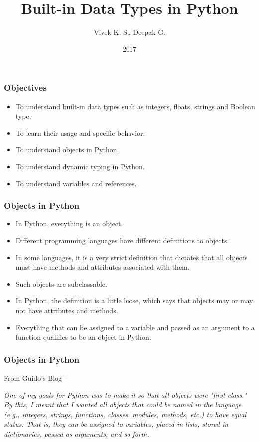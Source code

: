 \documentclass{beamer}
\title{Built-in Data Types in Python}
\author{Vivek K. S., Deepak G.}
\institute{Information Systems Decision Sciences (ISDS)\\
MUMA College of Business\\
University of South Florida \\
Tampa, Florida}
\date{2017}
\begin{document}
 
\frame{\titlepage}
 
\begin{frame}
\frametitle{Objectives}

\begin{itemize}
\item To understand built-in data types such as integers, floats, strings and Boolean type.
\item To learn their usage and specific behavior.
\item To understand objects in Python.
\item To understand dynamic typing in Python.
\item To understand variables and references.
\end{itemize}
\end{frame}

\begin{frame}
\frametitle{Objects in Python}
\begin{itemize}
\item In Python, everything is an object.
\item Different programming languages have different definitions to objects.
\item In some languages, it is a very strict definition that dictates that all objects must have methods and attributes associated with them.
\item Such objects are subclassable.
\item In Python, the definition is a little loose, which says that objects may or may not have attributes and methods.
\item Everything that can be assigned to a variable and passed as an argument to a function qualifies to be an object in Python.
\end{itemize}
\end{frame}

\begin{frame}
\frametitle{Objects in Python}
From Guido's Blog --

\textit{One of my goals for Python was to make it so that all objects were "first class." By this, I meant that I wanted all objects that could be named in the language (e.g., integers, strings, functions, classes, modules, methods, etc.) to have equal status. That is, they can be assigned to variables, placed in lists, stored in dictionaries, passed as arguments, and so forth.}
\end{frame}
\end{document}
